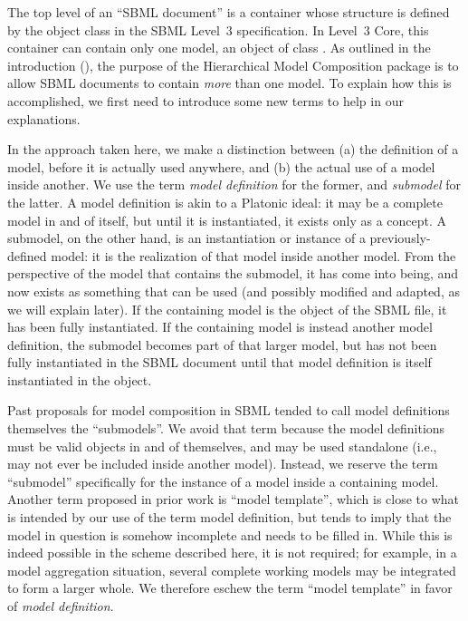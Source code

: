 The top level of an ``SBML document'' is a container whose structure is
defined by the object class \SBML in the SBML Level~3 specification.  In
Level~3 Core, this container can contain only one model, an object of
class \Model.  As outlined in the introduction (), the
purpose of the Hierarchical Model Composition package is to allow SBML
documents to contain \emph{more} than one model.  To explain how this is
accomplished, we first need to introduce some new terms to help in our
explanations.

In the approach taken here, we make a distinction between (a) the
definition of a model, before it is actually used anywhere, and (b) the
actual use of a model inside another.  We use the term \emph{model
  definition} for the former, and \emph{submodel} for the latter.  A
model definition is akin to a Platonic ideal: it may be a complete model
in and of itself, but until it is instantiated, it exists only as a
concept.  A submodel, on the other hand, is an instantiation or instance
of a previously-defined model: it is the realization of that model
inside another model.  From the perspective of the model that contains
the submodel, it has come into being, and now exists as something that
can be used (and possibly modified and adapted, as we will explain
later).  If the containing model is the \Model object of the SBML file,
it has been fully instantiated.  If the containing model is instead
another model definition, the submodel becomes part of that larger
model, but has not been fully instantiated in the SBML document until
that model definition is itself instantiated in the \Model object.

Past proposals for model composition in SBML tended to call model
definitions themselves the ``submodels''.  We avoid that term because the
model definitions must be valid \Model objects in and of themselves, and
may be used standalone (i.e., may not ever be included inside another
model).  Instead, we reserve the term ``submodel'' specifically for the
instance of a model inside a containing model.  Another term proposed in
prior work is ``model template'', which is close to what is intended by
our use of the term model definition, but tends to imply that the model
in question is somehow incomplete and needs to be filled in.  While this
is indeed possible in the scheme described here, it is not required; for
example, in a model aggregation situation, several complete working
models may be integrated to form a larger whole.  We therefore eschew
the term ``model template'' in favor of \emph{model definition}.

